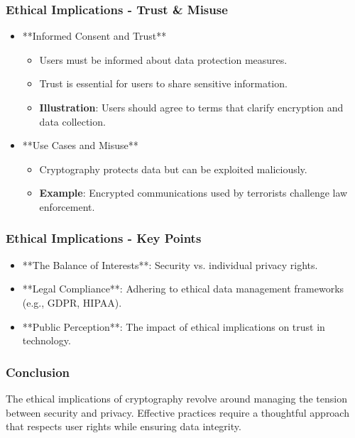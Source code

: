 \documentclass{beamer}
\begin{document}
\begin{frame}[fragile]
    \frametitle{Ethical Implications - Trust & Misuse}
    \begin{itemize}
        \item **Informed Consent and Trust**
            \begin{itemize}
                \item Users must be informed about data protection measures.
                \item Trust is essential for users to share sensitive information.
                \item \textbf{Illustration}: Users should agree to terms that clarify encryption and data collection.
            \end{itemize} 

        \item **Use Cases and Misuse**
            \begin{itemize}
                \item Cryptography protects data but can be exploited maliciously.
                \item \textbf{Example}: Encrypted communications used by terrorists challenge law enforcement.
            \end{itemize}
    \end{itemize}
\end{frame}

\begin{frame}[fragile]
    \frametitle{Ethical Implications - Key Points}
    \begin{itemize}
        \item **The Balance of Interests**: Security vs. individual privacy rights.
        \item **Legal Compliance**: Adhering to ethical data management frameworks (e.g., GDPR, HIPAA).
        \item **Public Perception**: The impact of ethical implications on trust in technology.
    \end{itemize}
\end{frame}

\begin{frame}[fragile]
    \frametitle{Conclusion}
    The ethical implications of cryptography revolve around managing the tension between security and privacy. 
    Effective practices require a thoughtful approach that respects user rights while ensuring data integrity. 
\end{frame}
\end{document}
